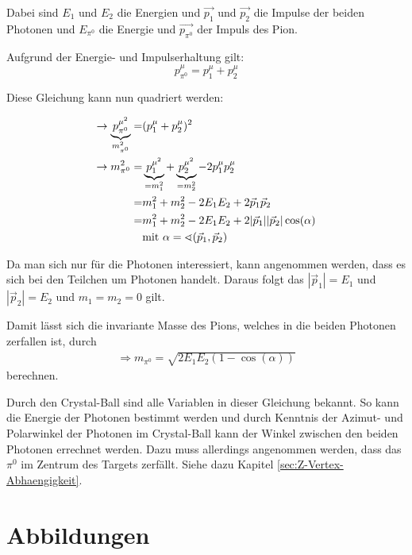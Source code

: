 \documentclass[a4paper,11pt,oneside,final,german,openbib,pdftex]{scrbook}
\begin{document}
{\begin{appendix}
Dabei sind $E_{1}$ und $E_{2}$ die Energien und $\vec{p_{1}}$ und $\vec{p_{2}}$ die Impulse der beiden Photonen und $E_{\pi^0}$ die Energie und $\vec{p_{\pi^0}}$ der Impuls des Pion.

Aufgrund der Energie- und Impulserhaltung gilt:
\begin{equation}
p^{\mu}_{\pi^0} = p^{\mu}_1 + p^{\mu}_2
\end{equation}

Diese Gleichung kann nun quadriert werden:

\begin{equation}
\begin{split}
\rightarrow \underbrace{p^{\mu^2}_{\pi^0}}_{m_{\pi^0}^2}=& (p_{1}^{\mu}+p_{2}^{\mu})^2 \\ 
\rightarrow m_{\pi^0}^2=& \underbrace{p_{1}^{\mu^2}}_{=m_1^2}+\underbrace{p_{2}^{\mu^2}}_{=m_2^2}-2p_{1}^{\mu}p_{2}^{\mu} \\ 
=& m_1^2+m_2^2-2E_1E_2+2\vec{p}_1\vec{p}_2 \\ 
=& m_1^2+m_2^2-2E_1E_2+2|\vec{p}_1| |\vec{p}_2| \cos(\alpha) \\
&\textnormal{mit } \alpha=\sphericalangle(\vec{p}_1,\vec{p}_2)
\end{split}
\end{equation}

Da man sich nur f\"ur die Photonen interessiert, kann angenommen werden, dass es sich bei den Teilchen um Photonen handelt. Daraus folgt das $|\vec{p}_1|=E_1$ und $|\vec{p}_2|=E_2$ und $m_1=m_2=0$ gilt.

Damit lässt sich die invariante Masse des Pions, welches in die beiden Photonen zerfallen ist, durch
\begin{equation}
\begin{split}
\Rightarrow{m_{\pi^0}=\sqrt{2E_1E_2(1-\cos(\alpha))}}
\label{eq:Formel-zur-Berechnung-der-Invariante-Masse-Herleitung}
\end{split}
\end{equation}
berechnen.

Durch den Crystal-Ball sind alle Variablen in dieser Gleichung bekannt. So kann die Energie der Photonen bestimmt werden und durch Kenntnis der Azimut- und Polarwinkel der Photonen im Crystal-Ball kann der Winkel zwischen den beiden Photonen errechnet werden. Dazu muss allerdings angenommen werden, dass das $\pi^0$ im Zentrum des Targets zerfällt. Siehe dazu Kapitel \ref{sec:Z-Vertex-Abhaengigkeit}.

\section{Abbildungen}


\end{appendix}}
\end{document}
